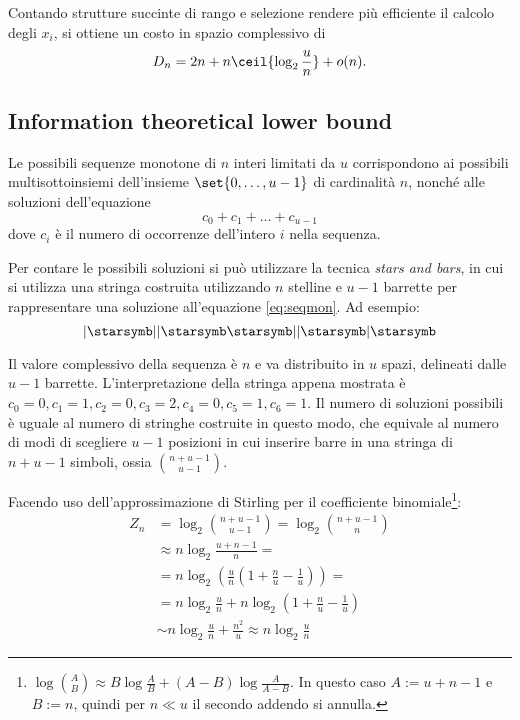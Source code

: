 Contando strutture succinte di rango e selezione rendere più efficiente il calcolo degli $x_i$, si ottiene un costo in spazio complessivo di
\begin{equation*}
	D_n = 2n+n\ceil{\log_2\frac un}+o(n) \text.
\end{equation*}


\subsection{Information theoretical lower bound}
Le possibili sequenze monotone di $n$ interi limitati da $u$ corrispondono ai possibili multisottoinsiemi dell'insieme $\set{0,\dots,u-1}$ di cardinalità $n$, nonché alle soluzioni dell'equazione
\begin{equation}\label{eq:seqmon}
	c_0+c_1+\dots+c_{u-1}
\end{equation}
dove $c_i$ è il numero di occorrenze dell'intero $i$ nella sequenza.

Per contare le possibili soluzioni si può utilizzare la tecnica \textit{stars and bars}, in
cui si utilizza una stringa costruita utilizzando $n$ stelline e $u-1$ barrette per rappresentare una soluzione all'equazione \ref{eq:seqmon}. Ad esempio:
\begin{equation*}
	| \starsymb || \starsymb \starsymb || \starsymb | \starsymb
\end{equation*}

Il valore complessivo della sequenza è $n$ e va distribuito in $u$ spazi, delineati dalle $u-1$ barrette.
L'interpretazione della stringa appena mostrata è $ c_0 = 0, c_1 = 1, c_2 = 0, c_3 = 2, c_4 = 0, c_5 = 1, c_6 = 1 $.
Il numero di soluzioni possibili è uguale al numero di stringhe costruite in questo modo, che equivale al numero di modi di scegliere $u-1$ posizioni in cui inserire barre in una stringa di $n+u-1$ simboli, ossia $\binom{n+u-1}{u - 1}$.

Facendo uso dell'approssimazione di Stirling per il coefficiente binomiale\footnote{$\log\binom AB \approx B\log\frac AB+(A-B)\log\frac{A}{A-B}$. In questo caso $A:=u+n-1$ e $B:=n$, quindi per $n\ll u$ il secondo addendo si annulla.}:
\begin{align*}
	Z_n & = \log_2\binom{n+u-1}{u - 1} = \log_2\binom{n+u-1}{n}              \\
	    & \approx n\log_2\frac{u+n-1}{n} =                                   \\
	    & = n\log_2\left(\frac un\left(1+\frac nu - \frac 1u\right)\right) = \\
	    & = n\log_2\frac un + n\log_2\left(1+\frac nu-\frac 1u\right)        \\
	    & \sim n\log_2\frac un + \frac{n^2}{u} \approx n\log_2\frac un
\end{align*}


